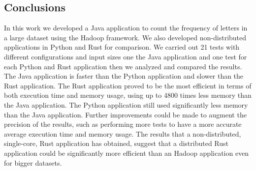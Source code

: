 \documentclass{article}
\begin{document}
\begin{multicols}{2}

\section{Conclusions}
    In this work we developed a Java application to count the frequency of letters in a large dataset
    using the Hadoop framework. We also developed non-distributed applications in Python and Rust for
    comparison.
    We carried out 21 tests with different configurations and input sizes one the Java application
    and one test for each Python and Rust application then we analyzed and compared the results.
    The Java application is faster than the Python application and slower than the Rust application.
    The Rust application proved to be the most efficient in terms of both execution time and memory usage,
    using up to 4800 times less memory than the Java application. 
    The Python application still used significantly less memory than the Java application.
    Further improvements could be made to augment the precision of the results, such as performing
    more tests to have a more accurate average execution time and memory usage.
    The results that a non-distributed, single-core, Rust application has obtained, suggest that 
    a distributed Rust application could be significantly more efficient than an Hadoop application
    even for bigger datasets.
\end{multicols}


\end{document}
